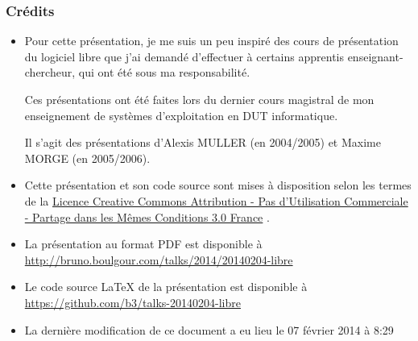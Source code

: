 \documentclass[10pt]{beamer}
\begin{document}
\begin{frame}
  \frametitle{Crédits}

  \small

  \begin{itemize}
  \item Pour cette présentation, je me suis un peu inspiré des cours de
    présentation du logiciel libre que j'ai demandé d'effectuer à certains
    apprentis enseignant-chercheur, qui ont été sous ma responsabilité.

    Ces présentations ont été faites lors du dernier cours magistral de mon
    enseignement de systèmes d'exploitation en DUT informatique.

    Il s'agit des présentations d'Alexis MULLER (en 2004/2005) et Maxime
    MORGE (en 2005/2006).
  
    \vfill
    
  \item Cette présentation et son code source sont mises à disposition
    selon les termes de la
    \href{https://creativecommons.org/licenses/by-nc-sa/3.0/fr/legalcode}{Licence
      Creative Commons Attribution - Pas d’Utilisation Commerciale - Partage
      dans les Mêmes Conditions 3.0 France} \ccbyncsa.

    \vfill

  \item La présentation au format PDF est disponible à \url{http://bruno.boulgour.com/talks/2014/20140204-libre}

    \vfill

  \item Le code source LaTeX de la présentation est disponible à \url{https://github.com/b3/talks-20140204-libre}

  \item La dernière modification de ce document a eu lieu le 07 février 2014 à 8:29 %
  \end{itemize}
\end{frame}
\end{document}
